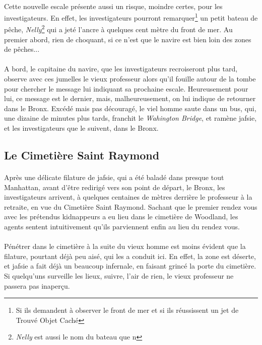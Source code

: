 \paragraph{} Cette nouvelle escale présente aussi un risque, moindre certes, pour les investigateurs. En effet, les investigateurs pourront
remarquer\footnote{Si ils demandent à observer le front de mer et si ils réussissent un jet de Trouvé Objet Caché} un petit bateau de pêche,
\emph{Nelly}\footnote{\emph{Nelly} est aussi le nom du bateau que n} qui a jeté l'ancre à quelques cent mètre du front de mer. Au premier 
abord, rien de choquant, si ce n'est que le navire est bien loin des zones de pêches...

\paragraph{} A bord, le capitaine du navire, que les investigateurs recroiseront plus tard, observe avec ces jumelles le vieux professeur
alors qu'il fouille autour de la tombe pour chercher le message lui indiquant sa prochaine escale. Heureusement pour lui, ce message est
le dernier, mais, malheureusement, on lui indique de retourner dans le Bronx. Excédé mais pas découragé, le viel homme saute dans un bus,
qui, une dizaine de minutes plus tards, franchit le \emph{Wahington Bridge}, et ramène \gls{jafsie}, et les investigateurs que le suivent,
dans le Bronx.

\subsection{Le Cimetière Saint Raymond}

\paragraph{} Après une délicate filature de \gls{jafsie}, qui a été baladé dans presque tout Manhattan, avant d'être redirigé vers son 
point de départ, le Bronx, les investigateurs arrivent, à quelques centaines de mètres derrière le professeur à la retraite, en vue du 
Cimetière Saint Raymond. Sachant que le premier rendez vous avec les prétendus kidnappeurs a eu lieu dans le cimetière de Woodland,
les agents sentent intuitivement qu'ils parviennent enfin au lieu du rendez vous.

\paragraph{} Pénétrer dans le cimetière à la suite du vieux homme est moins évident que la filature, pourtant déjà peu aisé, qui
les a conduit ici. En effet, la zone est déserte, et \gls{jafsie} a fait déjà un beaucoup infernale, en faisant grincé la porte du 
cimetière. Si quelqu'uns surveille les lieux, suivre, l'air de rien, le vieux professeur ne passera pas inaperçu. 

